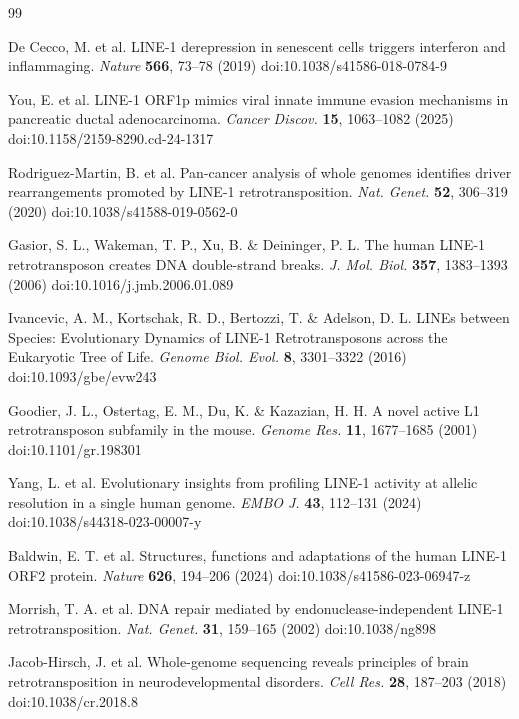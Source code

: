 \documentclass[11pt,twocolumn,twoside]{extarticle}
\begin{document}
\FloatBarrier
\begin{thebibliography}{99}
\footnotesize
\setlength{\itemsep}{0.12em}
\setlength{\parsep}{0pt}

 De Cecco, M. et al. LINE-1 derepression in senescent cells triggers interferon and inflammaging. \textit{Nature} \textbf{566}, 73--78 (2019) doi:10.1038/s41586-018-0784-9

 You, E. et al. LINE-1 ORF1p mimics viral innate immune evasion mechanisms in pancreatic ductal adenocarcinoma. \textit{Cancer Discov.} \textbf{15}, 1063--1082 (2025) doi:10.1158/2159-8290.cd-24-1317

 Rodriguez-Martin, B. et al. Pan-cancer analysis of whole genomes identifies driver rearrangements promoted by LINE-1 retrotransposition. \textit{Nat. Genet.} \textbf{52}, 306--319 (2020) doi:10.1038/s41588-019-0562-0

 Gasior, S. L., Wakeman, T. P., Xu, B. \& Deininger, P. L. The human LINE-1 retrotransposon creates DNA double-strand breaks. \textit{J. Mol. Biol.} \textbf{357}, 1383--1393 (2006) doi:10.1016/j.jmb.2006.01.089

 Ivancevic, A. M., Kortschak, R. D., Bertozzi, T. \& Adelson, D. L. LINEs between Species: Evolutionary Dynamics of LINE-1 Retrotransposons across the Eukaryotic Tree of Life. \textit{Genome Biol. Evol.} \textbf{8}, 3301--3322 (2016) doi:10.1093/gbe/evw243

 Goodier, J. L., Ostertag, E. M., Du, K. \& Kazazian, H. H. A novel active L1 retrotransposon subfamily in the mouse. \textit{Genome Res.} \textbf{11}, 1677--1685 (2001) doi:10.1101/gr.198301

 Yang, L. et al. Evolutionary insights from profiling LINE-1 activity at allelic resolution in a single human genome. \textit{EMBO J.} \textbf{43}, 112--131 (2024) doi:10.1038/s44318-023-00007-y

 Baldwin, E. T. et al. Structures, functions and adaptations of the human LINE-1 ORF2 protein. \textit{Nature} \textbf{626}, 194--206 (2024) doi:10.1038/s41586-023-06947-z

 Morrish, T. A. et al. DNA repair mediated by endonuclease-independent LINE-1 retrotransposition. \textit{Nat. Genet.} \textbf{31}, 159--165 (2002) doi:10.1038/ng898

 Jacob-Hirsch, J. et al. Whole-genome sequencing reveals principles of brain retrotransposition in neurodevelopmental disorders. \textit{Cell Res.} \textbf{28}, 187--203 (2018) doi:10.1038/cr.2018.8


\end{thebibliography}
\end{document}
